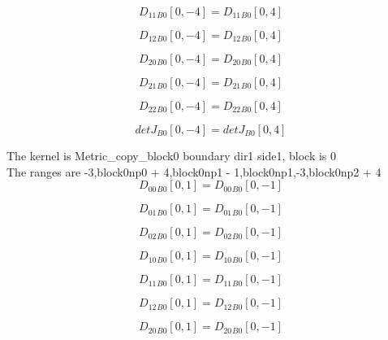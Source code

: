 \documentclass{article}
\begin{document}
\begin{dmath}{D_{11}{_{B0}}}[{0,-4}] = {D_{11}{_{B0}}}[{0,4}]\end{dmath}

\begin{dmath}{D_{12}{_{B0}}}[{0,-4}] = {D_{12}{_{B0}}}[{0,4}]\end{dmath}

\begin{dmath}{D_{20}{_{B0}}}[{0,-4}] = {D_{20}{_{B0}}}[{0,4}]\end{dmath}

\begin{dmath}{D_{21}{_{B0}}}[{0,-4}] = {D_{21}{_{B0}}}[{0,4}]\end{dmath}

\begin{dmath}{D_{22}{_{B0}}}[{0,-4}] = {D_{22}{_{B0}}}[{0,4}]\end{dmath}

\begin{dmath}{detJ{_{B0}}}[{0,-4}] = {detJ{_{B0}}}[{0,4}]\end{dmath}

\noindent The kernel is Metric_copy_block0 boundary dir1 side1, block is 0\\\noindent The ranges are -3,block0np0 + 4,block0np1 - 1,block0np1,-3,block0np2 + 4\\\begin{dmath}{D_{00}{_{B0}}}[{0,1}] = {D_{00}{_{B0}}}[{0,-1}]\end{dmath}

\begin{dmath}{D_{01}{_{B0}}}[{0,1}] = {D_{01}{_{B0}}}[{0,-1}]\end{dmath}

\begin{dmath}{D_{02}{_{B0}}}[{0,1}] = {D_{02}{_{B0}}}[{0,-1}]\end{dmath}

\begin{dmath}{D_{10}{_{B0}}}[{0,1}] = {D_{10}{_{B0}}}[{0,-1}]\end{dmath}

\begin{dmath}{D_{11}{_{B0}}}[{0,1}] = {D_{11}{_{B0}}}[{0,-1}]\end{dmath}

\begin{dmath}{D_{12}{_{B0}}}[{0,1}] = {D_{12}{_{B0}}}[{0,-1}]\end{dmath}

\begin{dmath}{D_{20}{_{B0}}}[{0,1}] = {D_{20}{_{B0}}}[{0,-1}]\end{dmath}
\end{document}
